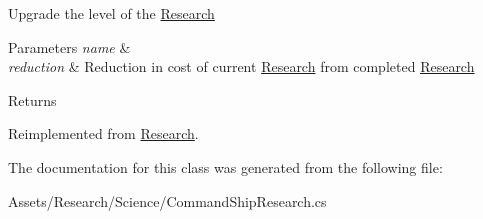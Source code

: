 Upgrade the level of the \hyperlink{class_research}{Research} 


\begin{DoxyParams}{Parameters}
{\em name} & \\
\hline
{\em reduction} & Reduction in cost of current \hyperlink{class_research}{Research} from completed \hyperlink{class_research}{Research}\\
\hline
\end{DoxyParams}
\begin{DoxyReturn}{Returns}

\end{DoxyReturn}


Reimplemented from \hyperlink{class_research_a963cb6ac5e27b234a3da2b1be640bc6a}{Research}.



The documentation for this class was generated from the following file\+:\begin{DoxyCompactItemize}
\item 
Assets/\+Research/\+Science/Command\+Ship\+Research.\+cs\end{DoxyCompactItemize}
